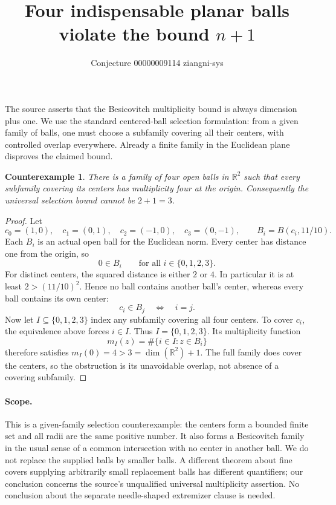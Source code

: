 \documentclass[11pt]{article}
\title{Four indispensable planar balls violate the bound $n+1$}
\author{Conjecture 00000009114 \quad ziangni-sys}
\date{}
\newtheorem*{proposition}{Counterexample}
\begin{document}
\maketitle
The source asserts that the Besicovitch multiplicity bound is always dimension plus one. We use the standard centered-ball selection formulation: from a given family of balls, one must choose a subfamily covering all their centers, with controlled overlap everywhere. Already a finite family in the Euclidean plane disproves the claimed bound.

\begin{proposition}
There is a family of four open balls in $\mathbb R^2$ such that every subfamily covering its centers has multiplicity four at the origin. Consequently the universal selection bound cannot be $2+1=3$.
\end{proposition}
\begin{proof}
Let
\[
 c_0=(1,0),\quad c_1=(0,1),\quad
 c_2=(-1,0),\quad c_3=(0,-1),
 \qquad B_i=B(c_i,11/10).
\]
Each $B_i$ is an actual open ball for the Euclidean norm. Every center has distance one from the origin, so
\[
 0\in B_i\qquad\text{for all }i\in\{0,1,2,3\}.
\]
For distinct centers, the squared distance is either $2$ or $4$. In particular it is at least $2>(11/10)^2$. Hence no ball contains another ball's center, whereas every ball contains its own center:
\[
 c_i\in B_j\quad\Longleftrightarrow\quad i=j.
\]
Now let $I\subseteq\{0,1,2,3\}$ index any subfamily covering all four centers. To cover $c_i$, the equivalence above forces $i\in I$. Thus $I=\{0,1,2,3\}$. Its multiplicity function
\[
 m_I(z)=\#\{i\in I:z\in B_i\}
\]
therefore satisfies $m_I(0)=4>3=\dim(\mathbb R^2)+1$. The full family does cover the centers, so the obstruction is its unavoidable overlap, not absence of a covering subfamily.
\end{proof}

\paragraph{Scope.}
This is a given-family selection counterexample: the centers form a bounded finite set and all radii are the same positive number. It also forms a Besicovitch family in the usual sense of a common intersection with no center in another ball. We do not replace the supplied balls by smaller balls. A different theorem about fine covers supplying arbitrarily small replacement balls has different quantifiers; our conclusion concerns the source's unqualified universal multiplicity assertion. No conclusion about the separate needle-shaped extremizer clause is needed.
\end{document}
